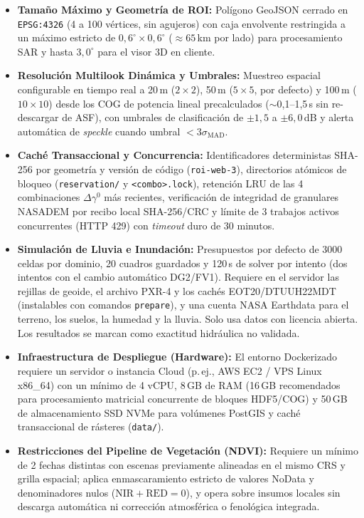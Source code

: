 \documentclass[10pt,a4paper]{article}
\begin{document}
\begin{itemize}
\item \textbf{Tamaño Máximo y Geometría de ROI:} Polígono GeoJSON cerrado en \texttt{EPSG:4326} (4 a 100 vértices, sin agujeros) con caja envolvente restringida a un máximo estricto de $0{,}6^\circ\times0{,}6^\circ$ ($\approx65$\,km por lado) para procesamiento SAR y hasta $3{,}0^\circ$ para el visor 3D en cliente.
\item \textbf{Resolución Multilook Dinámica y Umbrales:} Muestreo espacial configurable en tiempo real a 20\,m ($2\times2$), 50\,m ($5\times5$, por defecto) y 100\,m ($10\times10$) desde los COG de potencia lineal precalculados ($\sim$0,1–1,5\,s sin re-descargar de ASF), con umbrales de clasificación de $\pm1{,}5$ a $\pm6{,}0$\,dB y alerta automática de \emph{speckle} cuando umbral $<3\sigma_{\mathrm{MAD}}$.
\item \textbf{Caché Transaccional y Concurrencia:} Identificadores deterministas SHA-256 por geometría y versión de código (\texttt{roi-web-3}), directorios atómicos de bloqueo (\texttt{reservation/} y \texttt{<combo>.lock}), retención LRU de las 4 combinaciones $\Delta\gamma^0$ más recientes, verificación de integridad de granulares NASADEM por recibo local SHA-256/CRC y límite de 3 trabajos activos concurrentes (HTTP 429) con \emph{timeout} duro de 30 minutos.
\item \textbf{Simulación de Lluvia e Inundación:} Presupuestos por defecto de 3000 celdas por dominio, 20 cuadros guardados y 120\,s de solver por intento (dos intentos con el cambio automático DG2/FV1). Requiere en el servidor las rejillas de geoide, el archivo PXR-4 y los cachés EOT20/DTUUH22MDT (instalables con comandos \texttt{prepare}), y una cuenta NASA Earthdata para el terreno, los suelos, la humedad y la lluvia. Solo usa datos con licencia abierta. Los resultados se marcan como exactitud hidráulica no validada.
\item \textbf{Infraestructura de Despliegue (Hardware):} El entorno Dockerizado requiere un servidor o instancia Cloud (p.\,ej., AWS EC2 / VPS Linux x86\_64) con un mínimo de 4 vCPU, 8\,GB de RAM (16\,GB recomendados para procesamiento matricial concurrente de bloques HDF5/COG) y 50\,GB de almacenamiento SSD NVMe para volúmenes PostGIS y caché transaccional de rásteres (\texttt{data/}).
\item \textbf{Restricciones del Pipeline de Vegetación (NDVI):} Requiere un mínimo de 2 fechas distintas con escenas previamente alineadas en el mismo CRS y grilla espacial; aplica enmascaramiento estricto de valores NoData y denominadores nulos ($\mathrm{NIR}+\mathrm{RED}=0$), y opera sobre insumos locales sin descarga automática ni corrección atmosférica o fenológica integrada.
\end{itemize}
\end{document}

